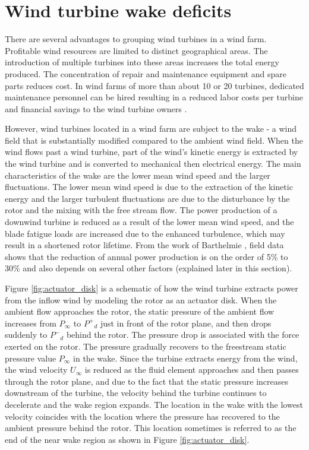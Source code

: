 \documentclass{umthesis}
\begin{document}
\section{Wind turbine wake deficits}\label{sec:wake_review}
There are several advantages to grouping wind turbines in a wind farm. Profitable wind resources are limited to distinct geographical areas. The introduction of multiple turbines into these areas increases the total energy produced. The concentration of repair and maintenance equipment and spare parts reduces cost. In wind farms of more than about 10 or 20 turbines, dedicated maintenance personnel can be hired resulting in a reduced labor costs per turbine and financial savings to the wind turbine owners \cite{WEE}.

However, wind turbines located in a wind farm are subject to the wake - a wind field that is substantially modified compared to the ambient wind field. When the wind flows past a wind turbine, part of the wind's kinetic energy is extracted by the wind turbine and is converted to mechanical then electrical energy. The main characteristics of the wake are the lower mean wind speed and the larger fluctuations. The lower mean wind speed is due to the extraction of the kinetic energy and the larger turbulent fluctuations are due to the disturbance by the rotor and the mixing with the free stream flow. The power production of a downwind turbine is reduced as a result of the lower mean wind speed, and the blade fatigue loads are increased due to the enhanced turbulence, which may result in a shortened rotor lifetime. From the work of Barthelmie \cite{Meteorological_controls, Ten_years, Barthelmie_Evaluation}, field data shows that the reduction of annual power production is on the order of 5\% to 30\% and also depends on several other factors (explained later in this section).


Figure \ref{fig:actuator_disk} is a schematic of how the wind turbine extracts power from the inflow wind by modeling the rotor as an actuator disk. When the ambient flow approaches the rotor, the static pressure of the ambient flow increases from $P_\infty$ to $P^+$$_d$ just in front of the rotor plane, and then drops suddenly to $P^-$$_d$ behind the rotor. The pressure drop is associated with the force exerted on the rotor. The pressure gradually recovers to the freestream static pressure value $P_\infty$ in the wake. Since the turbine extracts energy from the wind, the wind velocity $U_\infty$ is reduced as the fluid element approaches and then passes through the rotor plane, and due to the fact that the static pressure increases downstream of the turbine, the velocity behind the turbine continues to decelerate and the wake region expands. The location in the wake with the lowest velocity coincides with the location where the pressure has recovered to the ambient pressure behind the rotor. This location sometimes is referred to as the end of the near wake region as shown in Figure \ref{fig:actuator_disk}.
\end{document}
